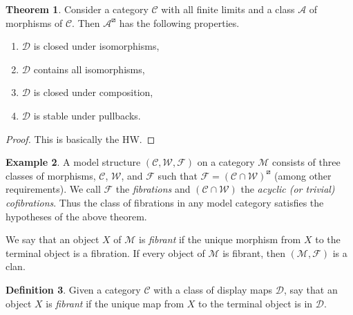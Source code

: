 \documentclass{article}
\theoremstyle{definition}
\newtheorem{definition}{Definition}[section]
\newtheorem{theorem}[definition]{Theorem}
\newtheorem{example}[definition]{Example}
\newcommand{\C}{\mathcal C}
\newcommand{\D}{\mathcal D}
\newcommand{\A}{\mathcal A}
\newcommand{\M}{\mathcal M}
\newcommand{\W}{\mathcal W}
\newcommand{\F}{\mathcal F}
\begin{document}
\begin{theorem}
    Consider a category $\C$ with all finite limits and a class $\A$ of morphisms of $\C$. Then $\A^\boxslash$ has the following properties.
    \begin{enumerate}
        \item $\D$ is closed under isomorphisms,
        \item $\D$ contains all isomorphisms,
        \item $\D$ is closed under composition,
        \item $\D$ is stable under pullbacks.
    \end{enumerate}
\end{theorem}
\begin{proof}
    This is basically the HW.
\end{proof}

\begin{example}
    A model structure $(\C, \W, \F)$ on a category $\M$ consists of three classes of morphisms, $\C$, $\W$, and $\F$ such that $\F = (\C \cap \W)^\boxslash$ (among other requirements). We call $\F$ the \emph{fibrations} and $(\C \cap \W)$ the \emph{acyclic (or trivial) cofibrations}. Thus the class of fibrations in any model category satisfies the hypotheses of the above theorem.
    
    We say that an object $X$ of $\M$ is \emph{fibrant} if the unique morphism from $X$ to the terminal object is a fibration. If every object of $\M$ is fibrant, then $(\M, \F)$ is a clan. 
\end{example}

\begin{definition}
    Given a category $\C$ with a class of display maps $\D$, say that an object $X$ is \emph{fibrant} if the unique map from $X$ to the terminal object is in $\D$.
\end{definition}



\end{document}
